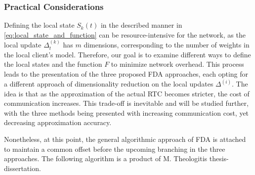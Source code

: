 \subsubsection{Practical Considerations}

Defining the local state \( S_k(t) \) in the described manner in \cref{eq:local_state_and_function} can be resource-intensive for the network, as
the local update \( \Delta_t^{(k)} \)
has \( m \) dimensions, corresponding to the number of weights in the local client’s model. Therefore, our goal is to examine different ways to
define the local states and the function \( F \) to minimize network overhead. This process leads to the presentation of the three proposed FDA
approaches, each opting for a different approach of dimensionality reduction on the local updates $\Delta^{(i)}$. The idea is that as the
approximation of the actual RTC becomes stricter, the cost of communication increases. This trade-off is inevitable and will be studied further,
with the three methods being presented with increasing communication cost, yet decreasing approximation accuracy.

Nonetheless, at this point, the
general algorithmic approach of FDA is attached to maintain a common offset before the upcoming branching in the three approaches. The
following algorithm is a product of M. Theologitis thesis-dissertation\cite{theologitismichaelAlgorithmsOnlineFederated2023}.

